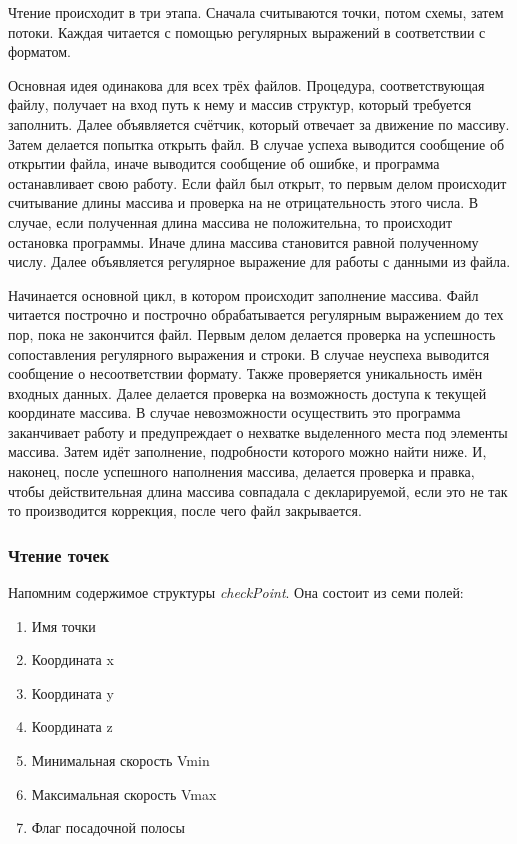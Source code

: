 \documentclass[12pt, a4 paper]{article}
\theoremstyle{plain}
\begin{document}
Чтение происходит в три этапа. Сначала считываются точки, потом схемы, затем потоки. Каждая читается с помощью регулярных выражений в соответствии с форматом.

Основная идея одинакова для всех трёх файлов. Процедура, соответствующая файлу, получает на вход путь к нему и массив структур, который требуется заполнить. Далее объявляется счётчик, который отвечает за движение по массиву. Затем делается попытка открыть файл. В случае успеха выводится сообщение об открытии файла, иначе выводится сообщение об ошибке, и программа останавливает свою работу. Если файл был открыт, то первым делом происходит считывание длины массива и проверка на не отрицательность этого числа. В случае, если полученная длина массива не положительна, то происходит остановка программы. Иначе длина массива становится равной полученному числу. Далее объявляется регулярное выражение для работы с данными из файла. 

Начинается основной цикл, в котором происходит заполнение массива. Файл читается построчно и построчно обрабатывается регулярным выражением до тех пор, пока не закончится файл. Первым делом делается проверка на успешность сопоставления регулярного выражения и строки. В случае неуспеха выводится сообщение о несоответствии формату. Также проверяется уникальность имён входных данных. Далее делается проверка на возможность доступа к текущей координате массива. В случае невозможности осуществить это программа заканчивает работу и предупреждает о нехватке выделенного места под элементы массива. Затем идёт заполнение, подробности которого можно найти ниже. И, наконец, после успешного наполнения массива, делается проверка и правка, чтобы действительная длина массива совпадала с декларируемой, если это не так то производится коррекция, после чего файл закрывается.




\subsubsection*{Чтение точек}

Напомним содержимое структуры \textit{checkPoint}. Она состоит из семи полей:

\begin{enumerate}
	\item Имя точки
	\item Координата x
	\item Координата y
	\item Координата z
	\item Минимальная скорость Vmin
	\item Максимальная скорость Vmax
	\item Флаг посадочной полосы
\end{enumerate}
\end{document}

